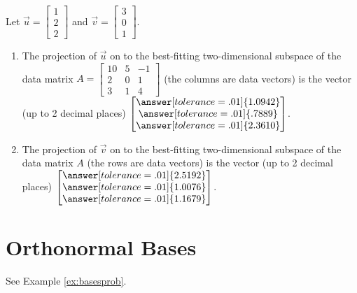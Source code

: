\documentclass{ximera}
\begin{document}
\begin{example}
    Let $\vec{u} = \begin{bmatrix} 1 \\ 2 \\ 2 \end{bmatrix}$ and $\vec{v} = \begin{bmatrix} 3 \\ 0 \\ 1 \end{bmatrix}$.
    \begin{enumerate}
        \item The projection of $\vec{u}$ on to the best-fitting two-dimensional subspace of the data matrix $A=\begin{bmatrix} 10 & 5 & -1 \\ 2 & 0 & 1 \\ 3 & 1 & 4 \end{bmatrix}$ (the columns are data vectors) is the vector (up to 2 decimal places) $\begin{bmatrix} \answer[tolerance=.01]{1.0942} \\ \answer[tolerance=.01]{.7889} \\ \answer[tolerance=.01]{2.3610} \end{bmatrix}$.
        
        \item The projection of $\vec{v}$ on to the best-fitting two-dimensional subspace of the data matrix $A$ (the rows are data vectors) is the vector (up to 2 decimal places) $\begin{bmatrix} \answer[tolerance=.01]{2.5192} \\ \answer[tolerance=.01]{1.0076} \\ \answer[tolerance=.01]{1.1679} \end{bmatrix}$.
    \end{enumerate}
\end{example}

\section*{Orthonormal Bases}

See Example \ref{ex:basesprob}.
\end{document}
